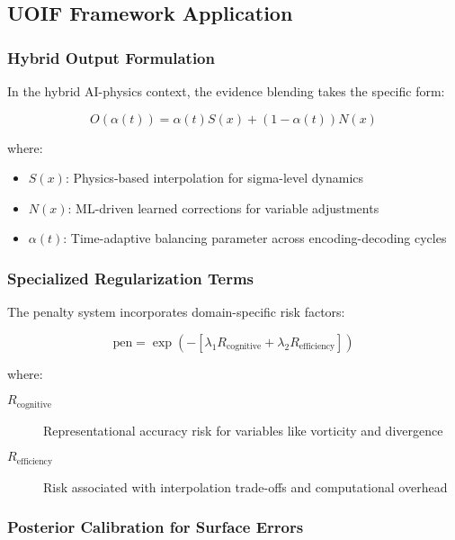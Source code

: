 \subsection{UOIF Framework Application}

\subsubsection{Hybrid Output Formulation}

In the hybrid AI-physics context, the evidence blending takes the specific form:

\begin{equation}
O(\alpha(t)) = \alpha(t) S(x) + (1-\alpha(t)) N(x)
\end{equation}

where:
\begin{itemize}
    \item $S(x)$: Physics-based interpolation for sigma-level dynamics
    \item $N(x)$: ML-driven learned corrections for variable adjustments  
    \item $\alpha(t)$: Time-adaptive balancing parameter across encoding-decoding cycles
\end{itemize}

\subsubsection{Specialized Regularization Terms}

The penalty system incorporates domain-specific risk factors:

\begin{equation}
\text{pen} = \exp(-[\lambda_1 R_{\text{cognitive}} + \lambda_2 R_{\text{efficiency}}])
\end{equation}

where:
\begin{description}
    \item[$R_{\text{cognitive}}$] Representational accuracy risk for variables like vorticity and divergence
    \item[$R_{\text{efficiency}}$] Risk associated with interpolation trade-offs and computational overhead
\end{description}

\subsubsection{Posterior Calibration for Surface Errors}

